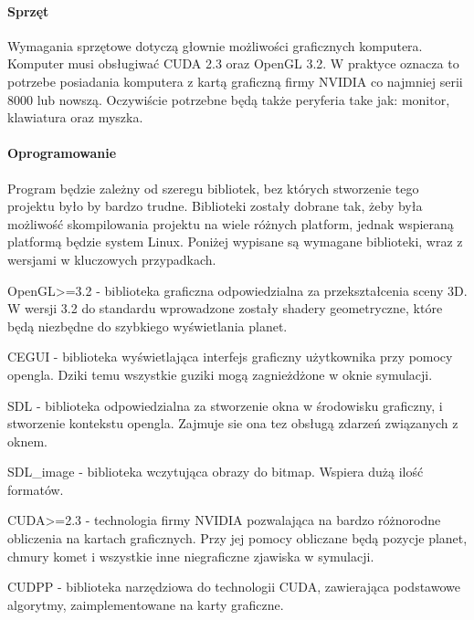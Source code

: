 \paragraph{Sprzęt}
Wymagania sprzętowe dotyczą głownie możliwości graficznych komputera. Komputer musi obsługiwać CUDA 2.3 oraz OpenGL 3.2. W praktyce oznacza to potrzebe posiadania komputera z kartą graficzną firmy NVIDIA co najmniej  serii 8000 lub nowszą. Oczywiście potrzebne będą także peryferia take jak: monitor, klawiatura oraz myszka.

\paragraph{Oprogramowanie}
Program będzie zależny od szeregu bibliotek, bez których stworzenie tego projektu było by bardzo trudne. Biblioteki zostały dobrane tak, żeby była możliwość skompilowania projektu na wiele różnych platform, jednak wspieraną platformą będzie system Linux. Poniżej wypisane są wymagane biblioteki, wraz z wersjami w kluczowych przypadkach.
\begin{description}
\item{OpenGL>=3.2} - biblioteka graficzna odpowiedzialna za przekształcenia sceny 3D. W wersji 3.2 do standardu wprowadzone zostały shadery geometryczne, które będą niezbędne do szybkiego wyświetlania planet.
\item{CEGUI} - biblioteka wyświetlająca interfejs graficzny użytkownika przy pomocy opengla. Dziki temu wszystkie guziki mogą zagnieżdżone w oknie symulacji.
\item{SDL} - biblioteka odpowiedzialna za stworzenie okna w środowisku graficzny, i stworzenie kontekstu opengla. Zajmuje sie ona tez obsługą zdarzeń związanych z oknem.
\item{SDL\_image} - biblioteka wczytująca obrazy do bitmap. Wspiera dużą ilość formatów.
\item{CUDA>=2.3} - technologia firmy NVIDIA pozwalająca na bardzo różnorodne obliczenia na kartach graficznych. Przy jej pomocy obliczane będą pozycje planet, chmury komet i wszystkie inne niegraficzne zjawiska w symulacji.
\item{CUDPP} - biblioteka narzędziowa do technologii CUDA, zawierająca podstawowe algorytmy, zaimplementowane na karty graficzne.
\end{description}


